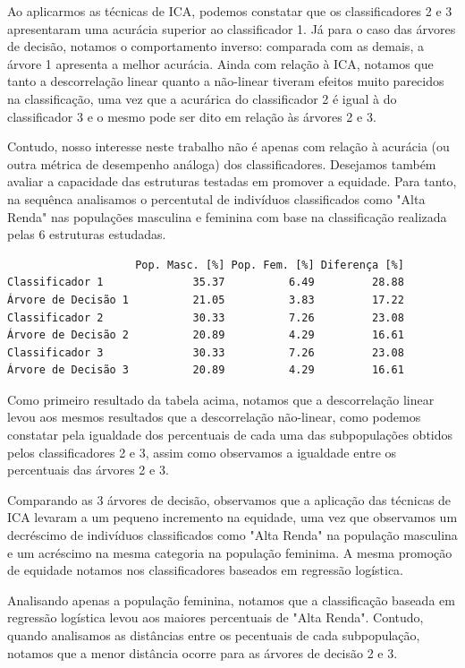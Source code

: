 \documentclass[11pt]{article}
\begin{document}
Ao aplicarmos as técnicas de ICA, podemos constatar que os
classificadores 2 e 3 apresentaram uma acurácia superior ao
classificador 1. Já para o caso das árvores de decisão, notamos o
comportamento inverso: comparada com as demais, a árvore 1 apresenta a
melhor acurácia. Ainda com relação à ICA, notamos que tanto a
descorrelação linear quanto a não-linear tiveram efeitos muito parecidos
na classificação, uma vez que a acurárica do classificador 2 é igual à
do classificador 3 e o mesmo pode ser dito em relação às árvores 2 e 3.

Contudo, nosso interesse neste trabalho não é apenas com relação à
acurácia (ou outra métrica de desempenho análoga) dos classificadores.
Desejamos também avaliar a capacidade das estruturas testadas em
promover a equidade. Para tanto, na sequênca analisamos o percentutal de
indivíduos classificados como "Alta Renda" nas populações masculina e
feminina com base na classificação realizada pelas 6 estruturas
estudadas.

    
    \begin{verbatim}
                    Pop. Masc. [%] Pop. Fem. [%] Diferença [%]
Classificador 1              35.37          6.49         28.88
Árvore de Decisão 1          21.05          3.83         17.22
Classificador 2              30.33          7.26         23.08
Árvore de Decisão 2          20.89          4.29         16.61
Classificador 3              30.33          7.26         23.08
Árvore de Decisão 3          20.89          4.29         16.61
    \end{verbatim}

    
    Como primeiro resultado da tabela acima, notamos que a descorrelação
linear levou aos mesmos resultados que a descorrelação não-linear, como
podemos constatar pela igualdade dos percentuais de cada uma das
subpopulações obtidos pelos classificadores 2 e 3, assim como observamos
a igualdade entre os percentuais das árvores 2 e 3.

Comparando as 3 árvores de decisão, observamos que a aplicação das
técnicas de ICA levaram a um pequeno incremento na equidade, uma vez que
observamos um decréscimo de indivíduos classificados como "Alta Renda"
na população masculina e um acréscimo na mesma categoria na população
feminima. A mesma promoção de equidade notamos nos classificadores
baseados em regressão logística.

Analisando apenas a população feminina, notamos que a classificação
baseada em regressão logística levou aos maiores percentuais de "Alta
Renda". Contudo, quando analisamos as distâncias entre os pecentuais de
cada subpopulação, notamos que a menor distância ocorre para as árvores
de decisão 2 e 3.
\end{document}
